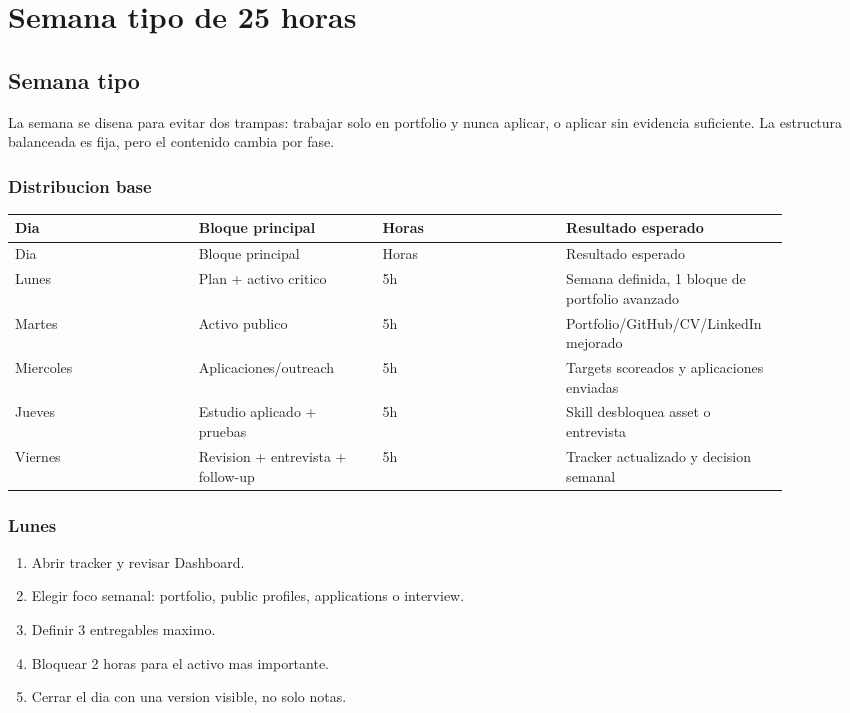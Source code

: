 \chapter{Semana tipo de 25 horas}

\section{Semana tipo}


La semana se disena para evitar dos trampas: trabajar solo en portfolio y nunca aplicar, o aplicar sin evidencia suficiente. La estructura balanceada es fija, pero el contenido cambia por fase.


\subsection{Distribucion base}


\begin{center}
\scriptsize
\begin{longtable}{>{\raggedright\arraybackslash}p{0.225\linewidth} >{\raggedright\arraybackslash}p{0.225\linewidth} >{\raggedright\arraybackslash}p{0.225\linewidth} >{\raggedright\arraybackslash}p{0.225\linewidth}}
\toprule
Dia & Bloque principal & Horas & Resultado esperado \\
\midrule
\endfirsthead
\toprule
Dia & Bloque principal & Horas & Resultado esperado \\
\midrule
\endhead
Lunes & Plan + activo critico & 5h & Semana definida, 1 bloque de portfolio avanzado \\
Martes & Activo publico & 5h & Portfolio/GitHub/CV/LinkedIn mejorado \\
Miercoles & Aplicaciones/outreach & 5h & Targets scoreados y aplicaciones enviadas \\
Jueves & Estudio aplicado + pruebas & 5h & Skill desbloquea asset o entrevista \\
Viernes & Revision + entrevista + follow-up & 5h & Tracker actualizado y decision semanal \\
\bottomrule
\end{longtable}
\end{center}



\subsection{Lunes}


\begin{enumerate}
\item Abrir tracker y revisar Dashboard.
\item Elegir foco semanal: portfolio, public profiles, applications o interview.
\item Definir 3 entregables maximo.
\item Bloquear 2 horas para el activo mas importante.
\item Cerrar el dia con una version visible, no solo notas.
\end{enumerate}


